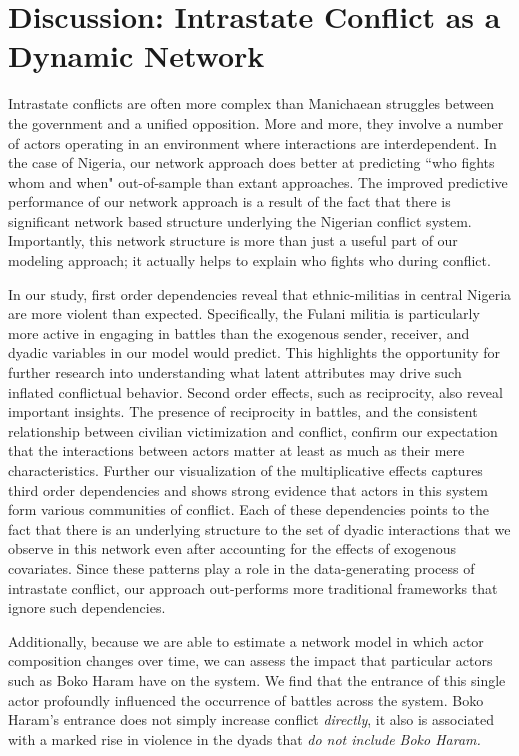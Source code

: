 \section*{Discussion: Intrastate Conflict as a Dynamic Network}

Intrastate conflicts are often more complex than Manichaean struggles between the government and a unified opposition. More and more, they involve a number of actors operating in an environment where interactions are interdependent. In the case of Nigeria, our network approach does better at predicting ``who fights whom and when" out-of-sample than extant approaches. The improved predictive performance of our network approach is a result of the fact that there is significant network based structure underlying the Nigerian conflict system. Importantly, this network structure is more than just a useful part of our modeling approach; it actually helps to explain who fights who during conflict. 

In our study, first order dependencies reveal that ethnic-militias in central Nigeria are more violent than expected. Specifically, the Fulani militia is particularly more active in engaging in battles than the exogenous sender, receiver, and dyadic variables in our model would predict. This highlights the opportunity for further research into understanding what latent attributes may drive such inflated conflictual behavior. Second order effects, such as reciprocity, also reveal important insights. The presence of reciprocity in battles, and the consistent relationship between civilian victimization and conflict, confirm our expectation that the interactions between actors matter at least as much as their mere characteristics. Further our visualization of the multiplicative effects captures third order dependencies and shows strong evidence that actors in this system form various communities of conflict. Each of these dependencies points to the fact that there is an underlying structure to the set of dyadic interactions that we observe in this network even after accounting for the effects of exogenous covariates. Since these patterns play a role in the data-generating process of intrastate conflict, our approach out-performs more traditional frameworks that ignore such dependencies.

Additionally, because we are able to estimate a network model in which actor composition changes over time, we can assess the impact that particular actors such as Boko Haram have on the system. We find that the entrance of this single actor profoundly influenced the occurrence of battles across the system. Boko Haram's entrance does not simply increase conflict \emph{directly}, it also is associated with a marked rise in violence in the dyads that \emph{do not include Boko Haram.} 

